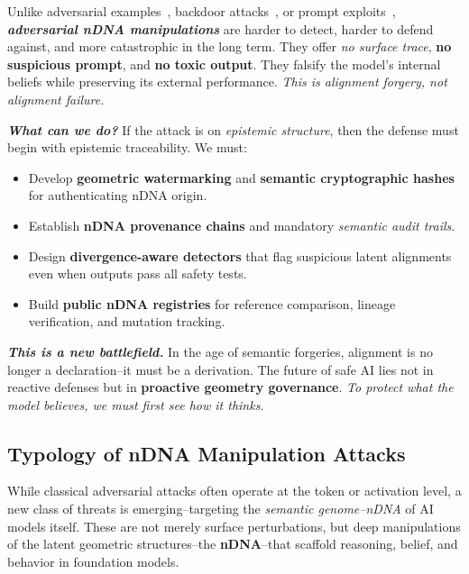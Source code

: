 \vspace{0.7em}

\noindent
Unlike adversarial examples~\citep{goodfellow2014explaining}, backdoor attacks~\citep{gu2017badnets, li2022backdoor}, or prompt exploits~\citep{zhu2023promptbench}, \textbf{\emph{adversarial nDNA manipulations}} are harder to detect, harder to defend against, and more catastrophic in the long term. They offer \emph{no surface trace}, \textbf{no suspicious prompt}, and \textbf{no toxic output}. They falsify the model’s internal beliefs while preserving its external performance. \emph{This is alignment forgery, not alignment failure.}

\vspace{0.7em}

\noindent
\textbf{\textit{What can we do?}} If the attack is on \emph{epistemic structure}, then the defense must begin with epistemic traceability. We must:

\begin{itemize}[leftmargin=1.5em]
    \item[--] Develop \textbf{geometric watermarking} and \textbf{semantic cryptographic hashes} for authenticating nDNA origin.
    \item[--] Establish \textbf{nDNA provenance chains} and mandatory \emph{semantic audit trails}.
    \item[--] Design \textbf{divergence-aware detectors} that flag suspicious latent alignments even when outputs pass all safety tests.
    \item[--] Build \textbf{public nDNA registries} for reference comparison, lineage verification, and mutation tracking.
\end{itemize}

\vspace{0.7em}

\noindent
\textbf{\emph{This is a new battlefield.}} In the age of semantic forgeries, alignment is no longer a declaration--it must be a derivation. The future of safe AI lies not in reactive defenses but in \textbf{proactive geometry governance}. \emph{To protect what the model believes, we must first see how it thinks.}


\subsection{Typology of nDNA Manipulation Attacks}

\vspace{0.8em}
\noindent
While classical adversarial attacks often operate at the token or activation level, a new class of threats is emerging--targeting the \emph{semantic genome--nDNA} of AI models itself. These are not merely surface perturbations, but deep manipulations of the latent geometric structures--the \textbf{nDNA}--that scaffold reasoning, belief, and behavior in foundation models.

